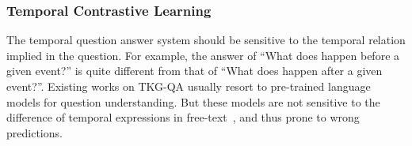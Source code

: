 \documentclass[11pt]{article}
\begin{document}
\begin{comment}

For each question, since we don't know the answer type, we combine the score  and  together: . Here the dimension of  is . The probability  could be get 



Then, we minimize the cross-entropy loss function

where  is the answer label of a question. 


A temporal estimation step is designed to locate the right occurrence time. We extract a subject entity s and a \textbf{timestamp t} from the question. If either is missing, we will use the existing embedding as  and .
Based on the embeddings of subject entity s and object entity o from KG and the temporal relation embedding  from a question, we design our time estimation function  for learning the time embedding  as follows:

where [.] is the concatenation function,  is a linear function.  denotes the real part of a complex vector and  is the imaginary part.

Since some simple temporal questions might contain the timestamp directly, we could get the  from a question. If the numerical timestamp is missing, we use a dummy time embedding instead. Then we get the final time estimation:

where  is a linear function.

After getting the vector of time estimation, if the answer type of a question is time, the following score function is able to get the scores


\noindent \textbf{Entity Answer Prediction.}
After getting the predicted time representation , we first calculate the object entity embedding  using entity function 


Similar to the time estimation, the score function for entity is 


\end{comment}

\subsubsection{Temporal Contrastive Learning}

The temporal question answer system should be sensitive to the temporal relation implied in the question. For example, the answer of ``What does happen before a given event?'' is quite different from that of ``What does happen after a given event?''. Existing works on TKG-QA usually resort to pre-trained language models for question understanding. But these models are not sensitive to the difference of temporal expressions in free-text~\cite{ning2020torque,dhingra2021time,shang2021open,han2021econet}, and thus prone to wrong predictions. 
\end{document}
